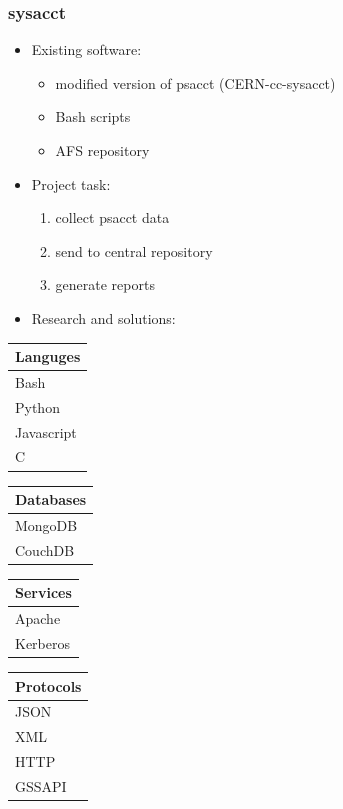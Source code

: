 \documentclass{beamer}
\begin{document}
\begin{frame}[t]
\frametitle{sysacct}
\begin{itemize}
\item Existing software:
\begin{itemize}
	\item modified version of psacct (CERN-cc-sysacct)
	\item Bash scripts
	\item AFS repository
\end{itemize}
 \item Project task:
\begin{enumerate}
	\item collect psacct data
	\item send to central repository
	\item generate reports
\end{enumerate}
 \item Research and solutions:
\end{itemize}
{ \tiny
\begin{center}
\begin{tabular}{|l|}
	\hline
	\textbf{Languges} \\
	\hline
	\hline
	Bash \\
	\hline
	Python \\
	\hline
	Javascript \\
	\hline
	C \\
	\hline
\end{tabular}
\begin{tabular}{|l|}
	\hline
	\textbf{Databases} \\
	\hline
	\hline
	MongoDB \\
	\hline
	CouchDB \\
	\hline
\end{tabular}
\begin{tabular}{|l|}
	\hline
	\textbf{Services} \\
	\hline
	\hline
	Apache \\
	\hline
	Kerberos \\
	\hline
\end{tabular}
\begin{tabular}{|l|}
	\hline
	\textbf{Protocols} \\
	\hline
	\hline
	JSON \\
	\hline
	XML \\
	\hline
	HTTP \\
	\hline
	GSSAPI \\
	\hline
\end{tabular}
\end{center}
}
\end{frame}
\end{document}
